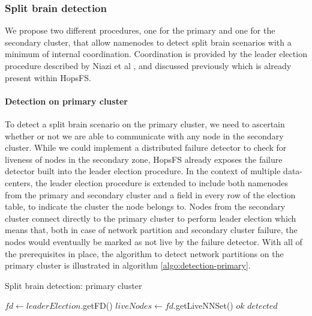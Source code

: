 \subsubsection{Split brain detection}
We propose two different procedures, one for the primary and one for the secondary cluster, that allow namenodes to detect split brain scenarios with a minimum of internal coordination.
Coordination is provided by the leader election procedure described by Niazi et al \cite{DBLP:conf/fast/NiaziIHDGR17}, and discussed previously which is already present within HopsFS.

\paragraph{Detection on primary cluster}

To detect a split brain scenario on the primary cluster, we need to ascertain whether or not we are able to communicate with any node in the secondary cluster.
While we could implement a distributed failure detector to check for liveness of nodes in the secondary zone, HopsFS already exposes the failure detector built into the leader election procedure.
In the context of multiple data-centers, the leader election procedure is extended to include both namenodes from the primary and secondary cluster and a field in every row of the election table, to indicate the cluster the node belongs to.
Nodes from the secondary cluster connect directly to the primary cluster to perform leader election which means that, both in case of network partition and secondary cluster failure, the nodes would eventually be marked as not live by the failure detector.
With all of the prerequisites in place, the algorithm to detect network partitions on the primary cluster is illustrated in algorithm \ref{algo:detection-primary}.

\begin{algorithm}[!ht]
	\begin{algorithmic}[1]
  		\caption{Split brain detection: primary cluster}
  		\label{algo:detection-primary}
  		\State $fd \leftarrow leaderElection$.getFD()
		\State $liveNodes \leftarrow fd$.getLiveNNSet()
		        \State \Return $ok$
		    \EndIf
		\EndFor
		\State \Return $detected$
  	\end{algorithmic}
\end{algorithm}


